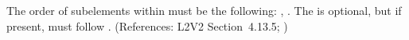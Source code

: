 The order of subelements within \KineticLaw must be the following:
, .  The  is
optional, but if present, must follow .  (References: L2V2
Section~4.13.5; )
